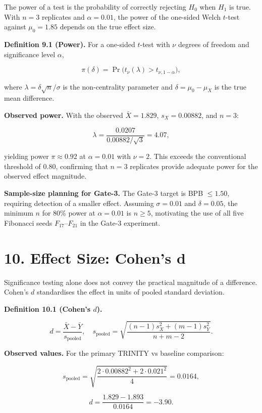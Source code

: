 The power of a test is the probability of correctly
rejecting \(H_0\) when \(H_1\) is true. With
\(n = 3\) replicates and \(\alpha = 0.01\), the
power of the one-sided Welch \(t\)-test against
\(\mu_0 = 1.85\) depends on the true effect size.

\textbf{Definition 9.1 (Power).} For a one-sided
\(t\)-test with \(\nu\) degrees of freedom and
significance level \(\alpha\),

\[\pi(\delta) = \Pr\!\bigl(t_\nu(\lambda) > t_{\nu,1-\alpha}\bigr),\]

where \(\lambda = \delta\sqrt{n}/\sigma\) is the
non-centrality parameter and \(\delta = \mu_0 -
\mu_X\) is the true mean difference.

\textbf{Observed power.} With the observed
\(\bar{X} = 1.829\), \(s_X = 0.00882\), and
\(n = 3\):

\[\lambda = \frac{0.0207}{0.00882/\sqrt{3}} = 4.07,\]

yielding power \(\pi \approx 0.92\) at
\(\alpha = 0.01\) with \(\nu = 2\). This exceeds
the conventional threshold of 0.80, confirming that
\(n = 3\) replicates provide adequate power for the
observed effect magnitude.

\textbf{Sample-size planning for Gate-3.} The
Gate-3 target is BPB \(\leq 1.50\), requiring
detection of a smaller effect. Assuming
\(\sigma = 0.01\) and \(\delta = 0.05\), the
minimum \(n\) for 80\% power at \(\alpha = 0.01\)
is \(n \geq 5\), motivating the use of all five
Fibonacci seeds \(F_{17}\)--\(F_{21}\) in the
Gate-3 experiment.

\section{10. Effect Size: Cohen's
d}\label{fa_19:effect-size-cohens-d}

Significance testing alone does not convey the
practical magnitude of a difference. Cohen's
\(d\) standardises the effect in units of pooled
standard deviation.

\textbf{Definition 10.1 (Cohen's \(d\)).}

\[d = \frac{\bar{X} - \bar{Y}}{s_{\text{pooled}}}, \quad s_{\text{pooled}} = \sqrt{\frac{(n-1)s_X^2 + (m-1)s_Y^2}{n+m-2}}.\]

\textbf{Observed values.} For the primary
TRINITY vs baseline comparison:

\[s_{\text{pooled}} = \sqrt{\frac{2 \cdot 0.00882^2 + 2 \cdot 0.021^2}{4}} = 0.0164,\]

\[d = \frac{1.829 - 1.893}{0.0164} = -3.90.\]

